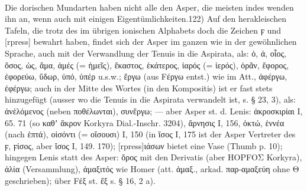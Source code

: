 \paragraph{} Die dorischen Mundarten haben nicht alle den Asper, die meisten
indes wenden ihn an, wenn auch mit einigen Eigentümlichkeiten.122) Auf den
herakleischen Tafeln, die trotz des im übrigen ionischen Alphabets doch die
Zeichen ϝ und [rpress] bewahrt haben, findet sich der Asper im ganzen wie in der
gewöhnlichen Sprache, auch mit der Verwandlung der Tenuis in die Aspirata, als:
ὁ, ἁ, οἷος, ὅσος, ὡς, ἅμα, ἁμές (= ἡμεῖς), ἕκαστος, ἑκάτερος, ἱαρός (= ἱερός),
ὁρᾶν, ἔφορος, ἐφορεύω, ὕδωρ, ὑπό, ὑπέρ u.s.w.; ἕργω (aus Fέργω entst.) wie im
Att., ἀφέργω, ἐφέργω; auch in der Mitte des Wortes (in den Kompositis) ist er
fast stets hinzugefügt (ausser wo die Tenuis in die Aspirata verwandelt ist, s.
§ 23, 3), als: ἀνἑλόμενος (neben ποθέλωνται), συνἕργω; — aber Asper st. d.
Lenis: ἁκροσκιρίαι Ι, 65. 71 (so καθʼ ἅκρον Korkyra Dial.-Inschr. 3204), ἅρνησις
Ι, 156, ὁκτώ, ἑννέα (nach ἑπτά), οἱσόντι (= οἴσουσι) Ι, 150 (in ἵσος Ι, 175 ist
der Asper Vertreter des ϝ, ϝίσος, aber ἴσος Ι, 149. 170); [rpress]ιάσων bietet
eine Vase (Thumb p. 10); hingegen Lenis statt des Asper: ὄρος mit den Derivatis
(aber ΗΟΡFΟΣ Korkyra), ἀλία (Versammlung), ἀμαξιτός wie Homer (att. ἁμαξ.,
arkad. παρ-αμαξεύη ohne Θ geschrieben); über Fέξ st. ἕξ s. § 16, 2 a). 

